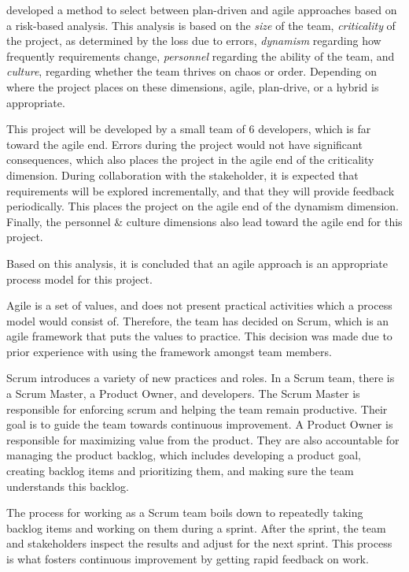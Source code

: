  developed a method to select between plan-driven and agile approaches based on a risk-based analysis.
This analysis is based on the \textit{size} of the team, \textit{criticality} of the project, as determined by the loss due to errors, \textit{dynamism} regarding how frequently requirements change, \textit{personnel} regarding the ability of the team, and \textit{culture}, regarding whether the team thrives on chaos or order. Depending on where the project places on these dimensions, agile, plan-drive, or a hybrid is appropriate.

This project will be developed by a small team of 6 developers, which is far toward the agile end.
Errors during the project would not have significant consequences, which also places the project in the agile end of the criticality dimension.
During collaboration with the stakeholder, it is expected that requirements will be explored incrementally, and that they will provide feedback periodically. This places the project on the agile end of the dynamism dimension.
Finally, the personnel \& culture dimensions also lead toward the agile end for this project.\cite{boehmObservationsBalancingDiscipline}

Based on this analysis, it is concluded that an agile approach is an appropriate process model for this project.

Agile is a set of values, and does not present practical activities which a process model would consist of. Therefore, the team has decided on Scrum, which is an agile framework that puts the values to practice. This decision was made due to prior experience with using the framework amongst team members.

Scrum introduces a variety  of new practices and roles. In a Scrum team, there is a Scrum Master, a Product Owner, and developers. The Scrum Master is responsible for enforcing scrum and helping the team remain productive. Their goal is to guide the team towards continuous improvement. A Product Owner is responsible for maximizing value from the product. They are also accountable for managing the product backlog, which includes developing a product goal, creating backlog items and prioritizing them, and making sure the team understands this backlog.

The process for working as a Scrum team boils down to repeatedly taking backlog items and working on them during a sprint. After the sprint, the team and stakeholders inspect the results and adjust for the next sprint. This process is what fosters continuous improvement by getting rapid feedback on work.

